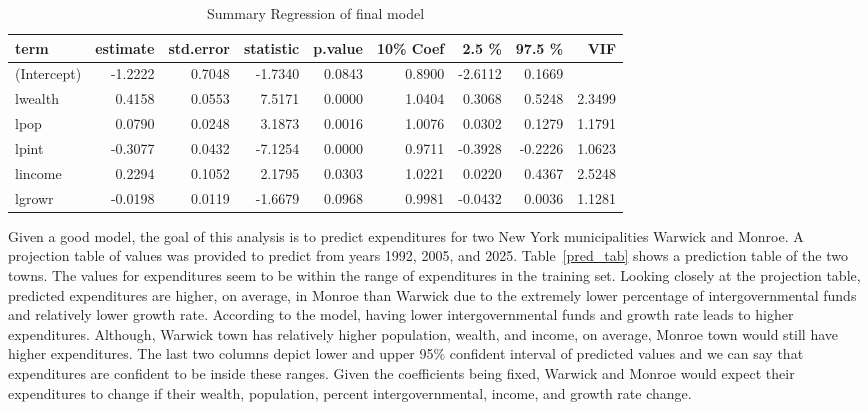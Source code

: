 \documentclass[11pt]{article}\usepackage[]{graphicx}\usepackage[]{color}
\begin{document}
\begin{center}
\begin{table}[ht]
\centering
\begin{tabular}{lrrrrrrrr}
  \hline
term & estimate & std.error & statistic & p.value & 10\% Coef & 2.5 \% & 97.5 \% & VIF \\ 
  \hline
(Intercept) & -1.2222 & 0.7048 & -1.7340 & 0.0843 & 0.8900 & -2.6112 & 0.1669 &  \\ 
  lwealth & 0.4158 & 0.0553 & 7.5171 & 0.0000 & 1.0404 & 0.3068 & 0.5248 & 2.3499 \\ 
  lpop & 0.0790 & 0.0248 & 3.1873 & 0.0016 & 1.0076 & 0.0302 & 0.1279 & 1.1791 \\ 
  lpint & -0.3077 & 0.0432 & -7.1254 & 0.0000 & 0.9711 & -0.3928 & -0.2226 & 1.0623 \\ 
  lincome & 0.2294 & 0.1052 & 2.1795 & 0.0303 & 1.0221 & 0.0220 & 0.4367 & 2.5248 \\ 
  lgrowr & -0.0198 & 0.0119 & -1.6679 & 0.0968 & 0.9981 & -0.0432 & 0.0036 & 1.1281 \\ 
   \hline
\end{tabular}
\caption{Summary Regression of final model} 
\label{reg_summary_final}
\end{table}

\end{center}

\noindent Given a good model, the goal of this analysis is to predict expenditures for two New York municipalities Warwick and Monroe. A projection table of values was provided to predict from years 1992, 2005, and 2025. Table~\ref{pred_tab} shows a prediction table of the two towns. The values for expenditures seem to be within the range of expenditures in the training set. Looking closely at the projection table, predicted expenditures are higher, on average, in Monroe than Warwick due to the extremely lower percentage of intergovernmental funds and relatively lower growth rate. According to the model, having lower intergovernmental funds and growth rate leads to higher expenditures. Although, Warwick town has relatively higher population, wealth, and income, on average, Monroe town would still have higher expenditures. The last two columns depict lower and upper 95\% confident interval of predicted values and we can say that expenditures are confident to be inside these ranges. Given the coefficients being fixed, Warwick and Monroe would expect their expenditures to change if their wealth, population, percent intergovernmental, income, and growth rate change.    
\end{document}
